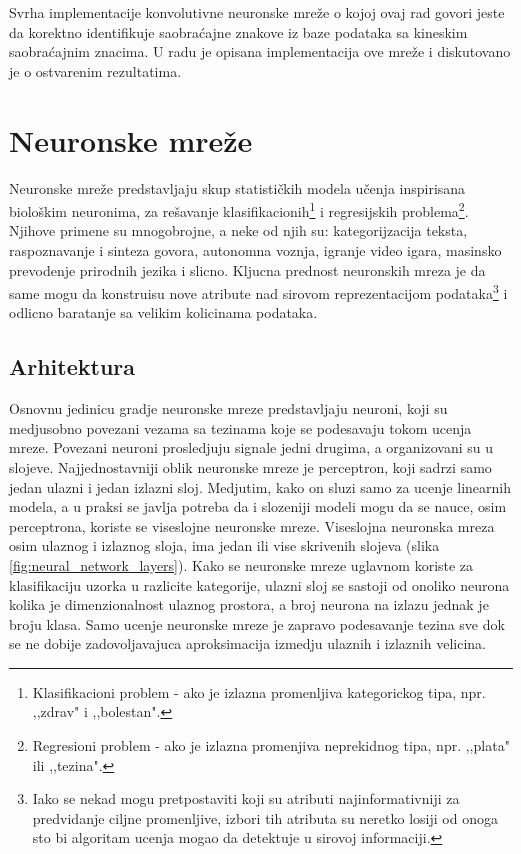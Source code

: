 \documentclass[a4paper]{article}
\begin{document}
Svrha implementacije konvolutivne neuronske mreže o kojoj ovaj rad govori jeste da korektno identifikuje saobraćajne znakove iz baze podataka sa kineskim saobraćajnim znacima. U radu je opisana implementacija ove mreže i diskutovano je o ostvarenim rezultatima.

\newpage

\section{Neuronske mreže}
\label{sec:cnn}

Neuronske mreže predstavljaju skup statističkih modela učenja inspirisana biološkim neuronima, za rešavanje klasifikacionih\footnote{Klasifikacioni problem - ako je izlazna promenljiva kategorickog tipa, npr. ,,zdrav" i ,,bolestan".} i regresijskih problema\footnote{Regresioni problem - ako je izlazna promenjiva neprekidnog tipa, npr. ,,plata" ili ,,tezina".}. Njihove primene su mnogobrojne, a neke od njih su: kategorijzacija teksta,
 raspoznavanje i sinteza govora, autonomna voznja, igranje video igara, masinsko prevodenje prirodnih jezika i slicno. Kljucna prednost neuronskih mreza je da same mogu da konstruisu nove atribute nad sirovom reprezentacijom podataka\footnote{Iako se nekad mogu pretpostaviti koji su atributi najinformativniji za predvidanje ciljne promenljive, izbori tih atributa su neretko losiji od onoga sto bi algoritam ucenja mogao da detektuje u sirovoj informaciji.} i odlicno baratanje sa velikim kolicinama podataka.


\subsection{Arhitektura}

Osnovnu jedinicu gradje neuronske mreze predstavljaju neuroni, koji su medjusobno povezani vezama sa tezinama koje se podesavaju tokom ucenja mreze. Povezani neuroni prosledjuju signale jedni drugima, a organizovani su u slojeve. Najjednostavniji oblik neuronske mreze je perceptron, koji sadrzi samo jedan ulazni i jedan izlazni sloj. Medjutim, kako on sluzi samo za ucenje linearnih modela, a u praksi se javlja potreba da i slozeniji modeli mogu da se nauce, osim perceptrona, koriste se viseslojne neuronske mreze. Viseslojna neuronska mreza osim ulaznog i izlaznog sloja, ima jedan ili vise skrivenih slojeva (slika \ref{fig:neural_network_layers}).
Kako se neuronske mreze uglavnom koriste za klasifikaciju uzorka u razlicite kategorije, ulazni sloj se sastoji od onoliko neurona kolika je dimenzionalnost ulaznog prostora, a broj neurona na izlazu jednak je broju klasa. Samo ucenje neuronske mreze je zapravo podesavanje tezina sve dok se ne dobije zadovoljavajuca aproksimacija izmedju ulaznih i izlaznih velicina.
\end{document}
